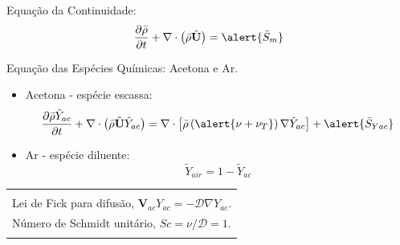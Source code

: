 \documentclass[bars,mathserif]{beamer}
\newcommand{\bv}[1]{\mathbf{#1}}
\begin{document}
%
\begin{frame}
\begin{block}{Equação da Continuidade:}
\begin{equation*}
  \frac{\partial \bar{\rho}}{\partial t} + \nabla \cdot \left( \bar{\rho}
\tilde{\bv{U}} \right) =  \alert{\bar{S}_m}
\end{equation*}
\end{block}
\end{frame}
%
\begin{frame}
\begin{block}{Equação das Espécies Químicas: Acetona e Ar.}
\begin{itemize}
 \pause
 \item<1-> Acetona - espécie escassa:
\begin{equation*}
 \frac{\partial \bar{\rho} \tilde{Y}_{ac} }{\partial t} + \nabla
\cdot\left(\bar{\rho} \tilde{\bv{U}} \tilde{Y}_{ac} \right) = \nabla \cdot \left[ \bar{\rho} \left( \alert{\nu + \nu_T} \right)
\nabla \tilde{Y}_{ac} \right] +\alert{\bar{S}_{Yac}}
\end{equation*}
\pause
\item<4-> Ar - espécie diluente:
\begin{equation*}
\tilde{Y}_{air} = 1- \tilde{Y}_{ac}
\end{equation*}
\end{itemize}
\end{block}
%
\footnotesize
\begin{tabular}{|l|}
\hline \\
Lei de Fick para difusão, $\bv{V}_{ac} Y_{ac} = -\mathcal{D} \nabla Y_{ac}$.\\
Número de Schmidt unitário, $Sc=\nu/\mathcal{D} = 1$. \\ \\
\hline 
\end{tabular}
%
%
\end{frame}
%
\end{document}
